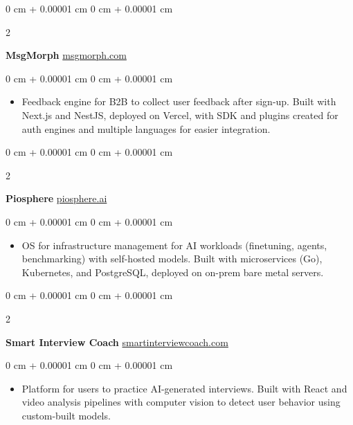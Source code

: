\documentclass[10pt, letterpaper]{article}
\newenvironment{highlights}{
    \begin{itemize}[
        topsep=0.10 cm,
        parsep=0.10 cm,
        partopsep=0pt,
        itemsep=0pt,
        leftmargin=0 cm + 10pt
    ]
}{
    \end{itemize}
} %
\newenvironment{onecolentry}{
    \begin{adjustwidth}{
        0 cm + 0.00001 cm
    }{
        0 cm + 0.00001 cm
    }
}{
    \end{adjustwidth}
} %
\newenvironment{twocolentry}[2][]{
    \onecolentry
    \def\secondColumn{#2}
    \setcolumnwidth{\fill, 4.5 cm}
    \begin{paracol}{2}
}{
    \switchcolumn \raggedleft \secondColumn
    \end{paracol}
    \endonecolentry
} %
\let\hrefWithoutArrow\href
\begin{document}
    \vspace{0.2 cm}

    \begin{twocolentry}{
        \hrefWithoutArrow{https://msgmorph.com}{msgmorph.com}
    }
        \textbf{MsgMorph}\end{twocolentry}
    \begin{onecolentry}
        \begin{highlights}
            \item Feedback engine for B2B to collect user feedback after sign-up. Built with Next.js and NestJS, deployed on Vercel, with SDK and plugins created for auth engines and multiple languages for easier integration.
        \end{highlights}
    \end{onecolentry}

    \vspace{0.2 cm}

    \begin{twocolentry}{
        \hrefWithoutArrow{https://piosphere.ai}{piosphere.ai}
    }
        \textbf{Piosphere}\end{twocolentry}
    \begin{onecolentry}
        \begin{highlights}
            \item OS for infrastructure management for AI workloads (finetuning, agents, benchmarking) with self-hosted models. Built with microservices (Go), Kubernetes, and PostgreSQL, deployed on on-prem bare metal servers.
        \end{highlights}
    \end{onecolentry}

    \vspace{0.2 cm}



    \begin{twocolentry}{
        \hrefWithoutArrow{https://smartinterviewcoach.com}{smartinterviewcoach.com}
    }
        \textbf{Smart Interview Coach}\end{twocolentry}
    \begin{onecolentry}
        \begin{highlights}
            \item Platform for users to practice AI-generated interviews. Built with React and video analysis pipelines with computer vision to detect user behavior using custom-built models.
        \end{highlights}
    \end{onecolentry}
\end{document}
